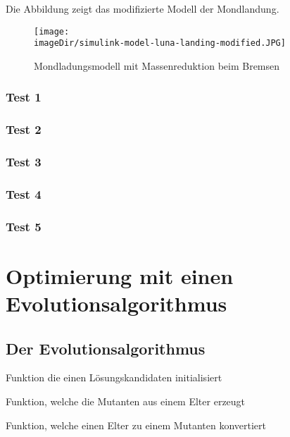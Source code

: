 Die Abbildung zeigt das modifizierte Modell der Mondlandung.
\begin{figure}[h]
	\centering
	\texttt{[image: \\imageDir/simulink-model-luna-landing-modified.JPG]}
	\caption{Mondladungsmodell mit Massenreduktion beim Bremsen}
	\label{fig:simulink-luna-landing-modified}
\end{figure}

\subsubsection{Test 1}
\subsubsection{Test 2}
\subsubsection{Test 3}
\subsubsection{Test 4}
\subsubsection{Test 5}

\newpage
\section{Optimierung mit einen Evolutionsalgorithmus}
\subsection{Der Evolutionsalgorithmus}

\begin{code}
	\caption{Funktion die einen Lösungskandidaten initialisiert}
	\label{fig:initialize-m}
\end{code}

\begin{code}
\caption{Funktion, welche die Mutanten aus einem Elter erzeugt}
\label{fig:bread-m}
\end{code}

\begin{code}
\caption{Funktion, welche einen Elter zu einem Mutanten konvertiert}
\label{fig:mutate-m}
\end{code}

